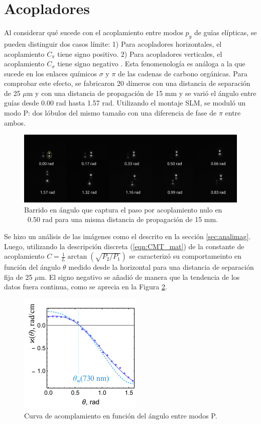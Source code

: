 \section{Acopladores}
Al considerar qué sucede con el acoplamiento entre modos $p_y$ de guías elípticas, se pueden distinguir dos casos límite: 1) Para acopladores horizontales, el acoplamiento $C_\pi$ tiene signo positivo. 2) Para acopladores verticales, el acoplamiento $C_\sigma$ tiene signo negativo \cite{Pmodecoupling}. Esta fenomenología es análoga a la que sucede en los enlaces químicos $\sigma$ y $\pi$ de las cadenas de carbono orgánicas. Para comprobar este efecto, se fabricaron 20 dímeros con una distancia de separación de 25 $\mu$m y con una distancia de propagación de 15 mm y se varió el ángulo entre guías desde 0.00 rad hasta 1.57 rad. Utilizando el montaje SLM, se moduló un modo P: dos lóbulos del mismo tamaño con una diferencia de fase de $\pi$ entre ambos.
\begin{figure}[H]
	\centering
	\includegraphics[trim={0 2cm 0 4cm},clip, width=\linewidth]{media/26um_15mm_angles.png}
	\caption{Barrido en ángulo que captura el paso por acoplamiento nulo en ~0.50 rad para una misma distancia de propagación de 15 mm. \label{fig:angulobarrido}}
\end{figure}
Se hizo un análisis de las imágenes como el descrito en la sección \ref{sec:analimag}. Luego, utilizando la descripción discreta (\ref{eqn:CMT_mat}) de la constante de acoplamiento $C = \frac{1}{L}\arctan\left(\sqrt{P_2/P_1}\right)$ se caracterizó su comportameinto en función del ángulo $\theta$ medido desde la horizontal para una distancia de separación fija de 25 $\mu$m. El signo negativo se añadió de manera que la tendencia de los datos fuera continua, como se aprecia en la Figura \ref{fig:coupangle}.
\begin{figure}[H]
\centering
	\includegraphics[width=0.5\linewidth]{media/couplingvsangle.jpg}
	\caption{Curva de acomplamiento en función del ángulo entre modos P.\label{fig:coupangle}}
\end{figure}
